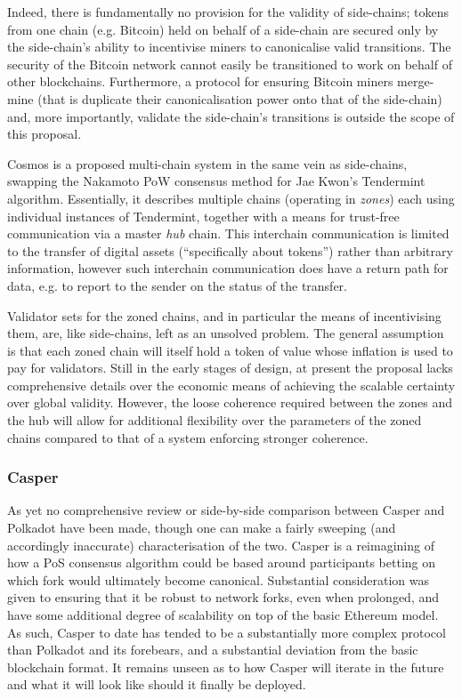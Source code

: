 \documentclass[usepdftitle=false]{beamer}
\makeatletter
\newcommand*\eg{e.g.\@\xspace}
\makeatother
\begin{document}
\begin{frame}
Indeed, there is fundamentally no provision for the validity of side-chains; tokens from one chain (\eg Bitcoin) held on behalf of a side-chain are secured only by the side-chain's ability to incentivise miners to canonicalise valid transitions. The security of the Bitcoin network cannot easily be transitioned to work on behalf of other blockchains. Furthermore, a protocol for ensuring Bitcoin miners merge-mine (that is duplicate their canonicalisation power onto that of the side-chain) and, more importantly, validate the side-chain's transitions is outside the scope of this proposal.

Cosmos \cite{kwon2016cosmos} is a proposed multi-chain system in the same vein as side-chains, swapping the Nakamoto PoW consensus method for Jae Kwon's Tendermint algorithm. Essentially, it describes multiple chains (operating in \textit{zones}) each using individual instances of Tendermint, together with a means for trust-free communication via a master \textit{hub} chain. This interchain communication is limited to the transfer of digital assets (``specifically about tokens'') rather than arbitrary information, however such interchain communication does have a return path for data, e.g. to report to the sender on the status of the transfer.

Validator sets for the zoned chains, and in particular the means of incentivising them, are, like side-chains, left as an unsolved problem. The general assumption is that each zoned chain will itself hold a token of value whose inflation is used to pay for validators. Still in the early stages of design, at present the proposal lacks comprehensive details over the economic means of achieving the scalable certainty over global validity. However, the loose coherence required between the zones and the hub will allow for additional flexibility over the parameters of the zoned chains compared to that of a system enforcing stronger coherence.

\subsubsection{Casper}\label{casper}

As yet no comprehensive review or side-by-side comparison between Casper \cite{buterin2016mauve} and Polkadot have been made, though one can make a fairly sweeping (and accordingly inaccurate) characterisation of the two. Casper is a reimagining of how a PoS consensus algorithm could be based around participants betting on which fork would ultimately become canonical. Substantial consideration was given to ensuring that it be robust to network forks, even when prolonged, and have some additional degree of scalability on top of the basic Ethereum model. As such, Casper to date has tended to be a substantially more complex protocol than Polkadot and its forebears, and a substantial deviation from the basic blockchain format. It remains unseen as to how Casper will iterate in the future and what it will look like should it finally be deployed.


\end{frame}
\end{document}
